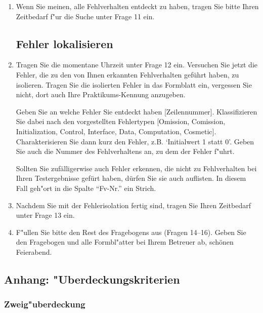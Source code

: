 \begin{enumerate}
\item Wenn Sie meinen, alle Fehlverhalten entdeckt zu haben, 
tragen Sie bitte Ihren Zeitbedarf f"ur die Suche unter Frage 11 ein.

\subsection*{Fehler lokalisieren}

\item Tragen Sie die momentane Uhrzeit unter Frage 12 ein.
Versuchen Sie jetzt die Fehler, die zu den von Ihnen erkannten
Fehlverhalten gef\"uhrt haben, zu isolieren.
Tragen Sie die isolierten Fehler in das Formblatt ein, vergessen Sie
nicht, dort auch Ihre Praktikums-Kennung anzugeben.

Geben Sie an welche Fehler Sie entdeckt haben
[Zeilennummer]. Klassifizieren Sie dabei nach den vorgestellten
Fehlertypen [{Omission, Comission}, {Initialization, Control,
Interface, Data, Computation, Cosmetic}]. Charakterisieren Sie dann
kurz den Fehler, z.B. `Initialwert 1 statt 0'. Geben Sie auch
die Nummer des Fehlverhaltens an, zu dem der Fehler f"uhrt.

Sollten Sie zuf\"alligerwise auch Fehler erkennen, die nicht zu
Fehlverhalten bei Ihren Testergebnisse gef\"urt haben, d\"urfen
Sie sie auch auflisten.  In diesem Fall geh"ort in die Spalte
"`Fv-Nr."' ein Strich.

\item Nachdem Sie mit der Fehlerisolation fertig sind, tragen Sie
Ihren Zeitbedarf unter Frage 13 ein.

\item F"ullen Sie bitte den Rest des Fragebogens aus (Fragen 14--16).
Geben Sie den Fragebogen und alle Formbl"atter bei Ihrem Betreuer ab,
   sch\"onen Feierabend.


\end{enumerate}

\subsection*{Anhang: "Uberdeckungskriterien}
\label{kriterien}

\subsubsection*{Zweig"uberdeckung}

